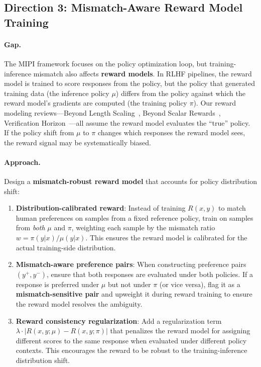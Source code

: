 \documentclass[11pt,a4paper]{article}
\begin{document}
\subsection{Direction 3: Mismatch-Aware Reward Model Training}

\paragraph{Gap.} The MIPI framework focuses on the policy optimization loop, but training-inference mismatch also affects \textbf{reward models}. In RLHF pipelines, the reward model is trained to score responses from the policy, but the policy that generated training data (the inference policy $\mu$) differs from the policy against which the reward model's gradients are computed (the training policy $\pi$). Our reward modeling reviews---Beyond Length Scaling~\cite{bls2026}, Beyond Scalar Rewards~\cite{bsr2026}, Verification Horizon~\cite{verificationhorizon2026}---all assume the reward model evaluates the ``true'' policy. If the policy shift from $\mu$ to $\pi$ changes which responses the reward model sees, the reward signal may be systematically biased.

\paragraph{Approach.} Design a \textbf{mismatch-robust reward model} that accounts for policy distribution shift:
\begin{enumerate}
\item \textbf{Distribution-calibrated reward}: Instead of training $R(x, y)$ to match human preferences on samples from a fixed reference policy, train on samples from \emph{both} $\mu$ and $\pi$, weighting each sample by the mismatch ratio $w = \pi(y|x)/\mu(y|x)$. This ensures the reward model is calibrated for the actual training-side distribution.
\item \textbf{Mismatch-aware preference pairs}: When constructing preference pairs $(y^+, y^-)$, ensure that both responses are evaluated under both policies. If a response is preferred under $\mu$ but not under $\pi$ (or vice versa), flag it as a \textbf{mismatch-sensitive pair} and upweight it during reward training to ensure the reward model resolves the ambiguity.
\item \textbf{Reward consistency regularization}: Add a regularization term $\lambda \cdot |R(x, y; \mu) - R(x, y; \pi)|$ that penalizes the reward model for assigning different scores to the same response when evaluated under different policy contexts. This encourages the reward to be robust to the training-inference distribution shift.
\end{enumerate}
\end{document}
